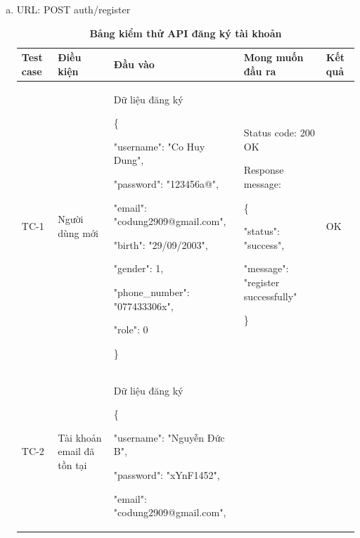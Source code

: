 \begin{enumerate}[a)]
	\item URL: POST auth/register

	      \break
	      \begin{xltabular}{\textwidth}{
		      | >{\raggedright\arraybackslash}p{1cm}
		      | >{\raggedright\arraybackslash}p{2.5cm}
		      | >{\raggedright\arraybackslash}X
		      | >{\raggedright\arraybackslash}X
		      | >{\raggedright\arraybackslash}p{1cm}|
		      }
		      \caption{\bfseries \fontsize{12pt}{0pt}\selectfont Bảng kiểm thử API đăng ký tài khoản}
		      \\
		      \hline
		      \bfseries Test case    &\bfseries Điều kiện   &\bfseries Đầu vào
		      &\bfseries Mong muốn đầu ra &\bfseries Kết quả\\ \hline


		      TC-1
		      & Người dùng mới
		      & Dữ liệu đăng ký

		      \{

		      "username": "Co Huy Dung",

		      "password": "123456a@",

		      "email": "codung2909@gmail.com",

		      "birth": "29/09/2003",

		      "gender": 1,

		      "phone\_number": "077433306x",

		      "role": 0

		      \}

		      &

		      Status code: 200 OK

		      Response message:

		      \{

		      "status": "success",

		      "message": "register successfully"

		      \}

		      & OK

		      \\ \hline

		      TC-2
		      & Tài khoản email đã tồn tại
		      & Dữ liệu đăng ký

		      \{

		      "username": "Nguyễn Đức B",

		      "password": "xYnF1452",

		      "email": "codung2909@gmail.com",


\end{xltabular}
\end{enumerate}
